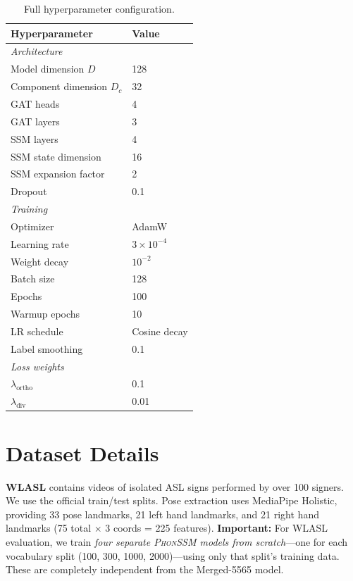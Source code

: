 \documentclass{article}
\newcommand{\phonssm}{\textsc{PhonSSM}}
\begin{document}
\begin{table}[ht]
\caption{Full hyperparameter configuration.}
\label{tab:hyperparams}
\vspace{-1mm}
\begin{center}
\begin{small}
\begin{tabular*}{\columnwidth}{@{\extracolsep{\fill}}ll@{}}
\toprule
Hyperparameter & Value \\
\midrule
\multicolumn{2}{l}{\textit{Architecture}} \\
Model dimension $D$ & 128 \\
Component dimension $D_c$ & 32 \\
GAT heads & 4 \\
GAT layers & 3 \\
SSM layers & 4 \\
SSM state dimension & 16 \\
SSM expansion factor & 2 \\
Dropout & 0.1 \\
\midrule
\multicolumn{2}{l}{\textit{Training}} \\
Optimizer & AdamW \\
Learning rate & $3 \times 10^{-4}$ \\
Weight decay & $10^{-2}$ \\
Batch size & 128 \\
Epochs & 100 \\
Warmup epochs & 10 \\
LR schedule & Cosine decay \\
Label smoothing & 0.1 \\
\midrule
\multicolumn{2}{l}{\textit{Loss weights}} \\
$\lambda_{\text{ortho}}$ & 0.1 \\
$\lambda_{\text{div}}$ & 0.01 \\
\bottomrule
\end{tabular*}
\end{small}
\end{center}
\vspace{-2mm}
\end{table}

\section{Dataset Details}
\label{app:datasets}

\textbf{WLASL} \citep{li2020word} contains videos of isolated ASL signs performed by over 100 signers. We use the official train/test splits. Pose extraction uses MediaPipe Holistic, providing 33 pose landmarks, 21 left hand landmarks, and 21 right hand landmarks (75 total $\times$ 3 coords = 225 features). \textbf{Important:} For WLASL evaluation, we train \textit{four separate \phonssm{} models from scratch}---one for each vocabulary split (100, 300, 1000, 2000)---using only that split's training data. These are completely independent from the Merged-5565 model.
\end{document}
